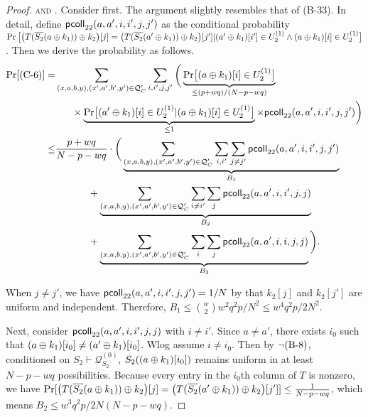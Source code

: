 \begin{proof}

%
%





\noindent\textsc{\csix and \cnine}. Consider \csix first. The argument slightly resembles that of (B-33). In detail, define $\mathsf{pcoll}_{22}(a,a',i,i',j,j')$ as the conditional probability $\Pr\big[\big(T(\overline{S_2}(a\oplus k_1))\oplus k_2\big)[j]=\big(T(\overline{S_2}(a'\oplus k_1))\oplus k_2\big)[j']|   
(a' \oplus k_1)[i']\in U_2^{(1)}\wedge(a \oplus k_1)[i]\in U_2^{(1)}\big]$. Then we derive the probability as follows.       
%
\begin{align*}
\Pr[\text{(C-6)}] 
=   &  \sum_{(x,a,b,y),(x',a',b',y')\in\mathcal{Q}_{C}'}\sum_{i,i',j,j'}\bigg(\underbrace{{\Pr}\big[(a\oplus k_1)[i]\in U_2^{(1)}\big]}_{\leq(p+wq)/(N-p-wq)}     \\
& \ \ \ \ \ \times
\underbrace{{\Pr}\big[(a'\oplus k_1)[i]\in U_2^{(1)}|(a\oplus k_1)[i]\in U_2^{(1)}\big]}_{\leq1}\times\mathsf{pcoll}_{22}(a,a',i,i',j,j') \bigg)      \\
\leq  &  \frac{p+wq}{N-p-wq}\cdot\bigg(
\underbrace{\sum_{(x,a,b,y),(x',a',b',y')\in\mathcal{Q}_{C}'}\sum_{i,i'}\sum_{j\neq j'}\mathsf{pcoll}_{22}(a,a',i,i',j,j')}_{B_1}     \\
& \ \ \ \ \ \ \ \ \ \    +  
\underbrace{\sum_{(x,a,b,y),(x',a',b',y')\in\mathcal{Q}_{C}'}\sum_{i\neq i'}\sum_{j}\mathsf{pcoll}_{22}(a,a',i,i',j,j)}_{B_2}      \\ 
& \ \ \ \ \ \ \ \ \ \    +  \underbrace{\sum_{(x,a,b,y),(x',a',b',y')\in\mathcal{Q}_{C}'}\sum_{i}\sum_{j}\mathsf{pcoll}_{22}(a,a',i,i,j,j)}_{B_3}\bigg)     .
\end{align*}
%
%

When $j\neq j'$, we have $\mathsf{pcoll}_{22}(a,a',i,i',j,j')=1/N$ by that $k_2[j]$ and $k_2[j']$ are uniform and independent. Therefore, $B_1\leq{w\choose2}w^2q^2p/N^2\leq w^4q^2p/2N^2$.


Next, consider $\mathsf{pcoll}_{22}(a,a',i,i',j,j)$ with $i\neq i'$. Since $a\neq a'$, there exists $i_0$ such that $(a\oplus k_1)[i_0]\neq(a'\oplus k_1)[i_0]$. Wlog assume $i\neq i_0$. Then by $\neg\text{(B-8)}$, conditioned on $S_2\vdash\mathcal{Q}_{S_2}^{(0)}$, $S_2((a\oplus k_1)[i_0])$ remains uniform in at least $N-p-wq$ possibilities. Because every entry in the $i_0$th column of $T$ is nonzero, we have ${\Pr}[\big(T(\overline{S_2}(a\oplus k_1))\oplus k_2\big)[j]=\big(T(\overline{S_2}(a'\oplus k_1))\oplus k_2\big)[j']]\leq\frac{1}{N-p-wq}$, which means $B_2\leq w^3q^2p/2N(N-p-wq)$.




\end{proof}
